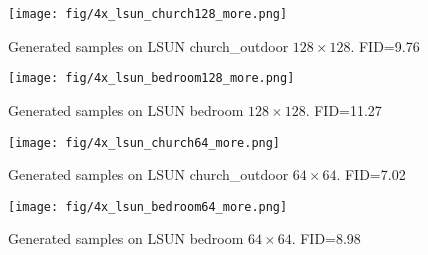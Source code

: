 \documentclass{article} \usepackage{iclr2021_conference,times}
\begin{document}
\begin{figure}[ht]
\begin{center}
\texttt{[image: fig/4x\_lsun\_church128\_more.png]}
\end{center}
\caption{Generated samples on LSUN church\_outdoor $128 \times 128$. FID=9.76}
\label{fig:church_128}
\end{figure}

\begin{figure}[ht]
\begin{center}
\texttt{[image: fig/4x\_lsun\_bedroom128\_more.png]}
\end{center}
\caption{Generated samples on LSUN bedroom $128 \times 128$. FID=11.27}
\label{fig:bedroom_128}
\end{figure}

\begin{figure}[ht]
\begin{center}
\texttt{[image: fig/4x\_lsun\_church64\_more.png]}
\end{center}
\caption{Generated samples on LSUN church\_outdoor $64 \times 64$. FID=7.02}
\label{fig:church_64}
\end{figure}

\begin{figure}[ht]
\begin{center}
\texttt{[image: fig/4x\_lsun\_bedroom64\_more.png]}
\end{center}
\caption{Generated samples on LSUN bedroom $64 \times 64$. FID=8.98}
\label{fig:bedroom_64}
\end{figure}
\end{document}

